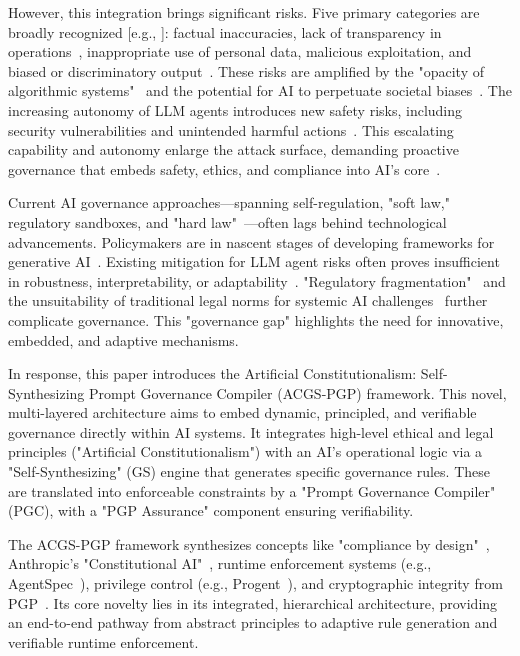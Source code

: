 \documentclass[sigconf,review,anonymous=false]{acmart} %
\begin{document}
However, this integration brings significant risks. Five primary categories are broadly recognized [e.g., \cite{FPFGenAIGov24}]: factual inaccuracies, lack of transparency in operations~\cite{EuroParlAlgoTransparency19}, inappropriate use of personal data, malicious exploitation, and biased or discriminatory output~\cite{WorldBankAIGov24}. These risks are amplified by the "opacity of algorithmic systems"~\cite{EuroParlAlgoTransparency19} and the potential for AI to perpetuate societal biases~\cite{WorldBankAIGov24}. The increasing autonomy of LLM agents introduces new safety risks, including security vulnerabilities and unintended harmful actions~\cite{WangAgentSpec25}. This escalating capability and autonomy enlarge the attack surface, demanding proactive governance that embeds safety, ethics, and compliance into AI's core~\cite{LiMAST25}.

Current AI governance approaches—spanning self-regulation, "soft law," regulatory sandboxes, and "hard law"~\cite{WorldBankAIGov24}—often lags behind technological advancements. Policymakers are in nascent stages of developing frameworks for generative AI~\cite{FPFGenAIGov24}. Existing mitigation for LLM agent risks often proves insufficient in robustness, interpretability, or adaptability~\cite{WangAgentSpec25}. "Regulatory fragmentation"~\cite{FPFGenAIGov24} and the unsuitability of traditional legal norms for systemic AI challenges~\cite{HuqConstitutionalRightsML} further complicate governance. This "governance gap" highlights the need for innovative, embedded, and adaptive mechanisms.

In response, this paper introduces the Artificial Constitutionalism: Self-Synthesizing Prompt Governance Compiler (ACGS-PGP) framework. This novel, multi-layered architecture aims to embed dynamic, principled, and verifiable governance directly within AI systems. It integrates high-level ethical and legal principles ("Artificial Constitutionalism") with an AI's operational logic via a "Self-Synthesizing" (GS) engine that generates specific governance rules. These are translated into enforceable constraints by a "Prompt Governance Compiler" (PGC), with a "PGP Assurance" component ensuring verifiability.

The ACGS-PGP framework synthesizes concepts like "compliance by design"~\cite{MartinezComplianceByDesign19}, Anthropic's "Constitutional AI"~\cite{AnthropicConstitutionalAI}, runtime enforcement systems (e.g., AgentSpec~\cite{WangAgentSpec25}), privilege control (e.g., Progent~\cite{LianProgent25}), and cryptographic integrity from PGP~\cite{WikipediaPGP}. Its core novelty lies in its integrated, hierarchical architecture, providing an end-to-end pathway from abstract principles to adaptive rule generation and verifiable runtime enforcement.
\end{document}
